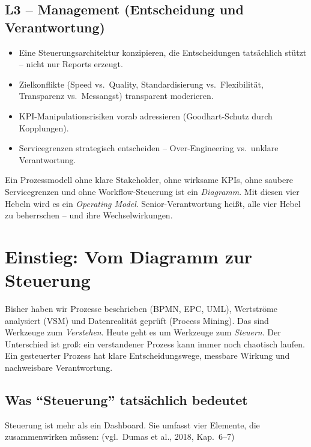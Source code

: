 \documentclass[11pt,a4paper,oneside]{article}
\newcommand{\quelle}[1]{{\footnotesize\color{lpGray}(#1)}}
\begin{document}
\subsection*{L3 -- Management (Entscheidung und Verantwortung)}
\begin{itemize}
  \item Eine Steuerungsarchitektur konzipieren, die Entscheidungen tatsächlich stützt -- nicht nur Reports erzeugt.
  \item Zielkonflikte (Speed vs.\ Quality, Standardisierung vs.\ Flexibilität, Transparenz vs.\ Messangst) transparent moderieren.
  \item KPI-Manipulationsrisiken vorab adressieren (Goodhart-Schutz durch Kopplungen).
  \item Servicegrenzen strategisch entscheiden -- Over-Engineering vs.\ unklare Verantwortung.
\end{itemize}

\begin{merkbox}
Ein Prozessmodell ohne klare Stakeholder, ohne wirksame KPIs, ohne saubere Servicegrenzen und ohne Workflow-Steuerung ist ein \emph{Diagramm}. Mit diesen vier Hebeln wird es ein \emph{Operating Model}. Senior-Verantwortung heißt, alle vier Hebel zu beherrschen -- und ihre Wechselwirkungen.
\end{merkbox}

\clearpage

\section{Einstieg: Vom Diagramm zur Steuerung}

Bisher haben wir Prozesse beschrieben (BPMN, EPC, UML), Wertströme analysiert (VSM) und Datenrealität geprüft (Process Mining). Das sind Werkzeuge zum \emph{Verstehen}. Heute geht es um Werkzeuge zum \emph{Steuern}. Der Unterschied ist groß: ein verstandener Prozess kann immer noch chaotisch laufen. Ein gesteuerter Prozess hat klare Entscheidungswege, messbare Wirkung und nachweisbare Verantwortung.

\subsection{Was ``Steuerung'' tatsächlich bedeutet}

Steuerung ist mehr als ein Dashboard. Sie umfasst vier Elemente, die zusammenwirken müssen: \quelle{vgl.\ Dumas et al., 2018, Kap.~6--7}
\end{document}
